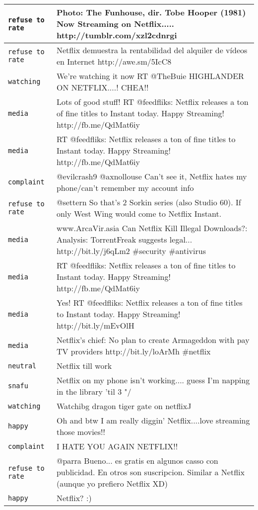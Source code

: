 {\begin{longtable}{|l|p{160mm}|}
      \tabularnewline\hline
         \texttt{refuse to rate} & Photo: The Funhouse, dir. Tobe Hooper (1981) Now Streaming on Netflix..... http://tumblr.com/xzl2cdnrgi
      \tabularnewline\hline
         \texttt{refuse to rate} & Netflix demuestra la rentabilidad del alquiler de vídeos en Internet http://awe.sm/5IcC8
      \tabularnewline\hline
         \texttt{watching} & We're watching it now RT @TheBuie HIGHLANDER ON NETFLIX....! CHEA!!
      \tabularnewline\hline
         \texttt{media} & Lots of good stuff! RT @feedfliks: Netflix releases a ton of fine titles to Instant today. Happy Streaming! http://fb.me/QdMat6iy
      \tabularnewline\hline
         \texttt{media} & RT @feedfliks: Netflix releases a ton of fine titles to Instant today. Happy Streaming! http://fb.me/QdMat6iy
      \tabularnewline\hline
         \texttt{complaint} & @evilcrash9 @axnollouse Can't see it, Netflix hates my phone/can't remember my account info
      \tabularnewline\hline
         \texttt{refuse to rate} & @settern So that's 2 Sorkin series (also Studio 60). If only West Wing would come to Netflix Instant.
      \tabularnewline\hline
         \texttt{media} & www.ArcaVir.asia Can Netflix Kill Illegal Downloads?: Analysis: TorrentFreak suggests legal... http://bit.ly/j6qLm2 \#security \#antivirus
      \tabularnewline\hline
         \texttt{media} & RT @feedfliks: Netflix releases a ton of fine titles to Instant today. Happy Streaming! http://fb.me/QdMat6iy
      \tabularnewline\hline
         \texttt{media} & Yes! RT @feedfliks: Netflix releases a ton of fine titles to Instant today. Happy Streaming! http://bit.ly/mEvOlH
      \tabularnewline\hline
         \texttt{media} & Netflix's chief: No plan to create Armageddon with pay TV providers http://bit.ly/loArMh \#netflix
      \tabularnewline\hline
         \texttt{neutral} & Netflix till work
      \tabularnewline\hline
         \texttt{snafu} & Netflix on my phone isn't working.... guess I'm napping in the library 'til 3 "/
      \tabularnewline\hline
         \texttt{watching} & Watchibg dragon tiger gate on netflix^^
      \tabularnewline\hline
         \texttt{happy} & Oh and btw I am really diggin' Netflix....love streaming those movies!!
      \tabularnewline\hline
         \texttt{complaint} & I HATE YOU AGAIN NETFLIX!!
      \tabularnewline\hline
         \texttt{refuse to rate} & @parra Bueno... es gratis en algunos casso con publicidad. En otros son suscripcion. Similar a Netflix (aunque yo prefiero Netflix XD)
      \tabularnewline\hline
         \texttt{happy} & Netflix? :)
      \tabularnewline\hline
   \end{longtable}
}
